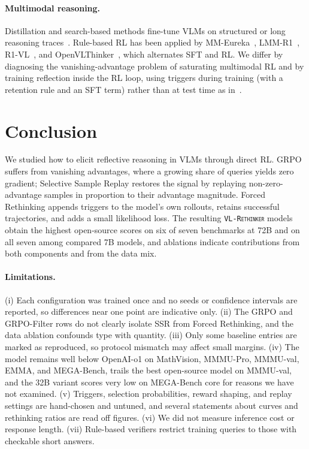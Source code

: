 \documentclass{article}
\newcommand{\model}{\texttt{\textsc{VL-Rethinker}}\xspace}
\begin{document}
\paragraph{Multimodal reasoning.} Distillation and search-based methods fine-tune VLMs on structured or long reasoning traces~\citep{llavacot,Mulberry,llamav_o1,insight_v,R1OneVision,vision-r1,virgo}. Rule-based RL has been applied by MM-Eureka~\citep{mmeureka}, LMM-R1~\citep{lmm-r1}, R1-VL~\citep{r1vl}, and OpenVLThinker~\citep{OpenVLThinker}, which alternates SFT and RL. We differ by diagnosing the vanishing-advantage problem of saturating multimodal RL and by training reflection inside the RL loop, using triggers during training (with a retention rule and an SFT term) rather than at test time as in~\citet{s1}.

\section{Conclusion}
\label{sec:conclusion}

We studied how to elicit reflective reasoning in VLMs through direct RL. GRPO suffers from vanishing advantages, where a growing share of queries yields zero gradient; Selective Sample Replay restores the signal by replaying non-zero-advantage samples in proportion to their advantage magnitude. Forced Rethinking appends triggers to the model's own rollouts, retains successful trajectories, and adds a small likelihood loss. The resulting \model models obtain the highest open-source scores on six of seven benchmarks at 72B and on all seven among compared 7B models, and ablations indicate contributions from both components and from the data mix.

\paragraph{Limitations.} (i) Each configuration was trained once and no seeds or confidence intervals are reported, so differences near one point are indicative only. (ii) The GRPO and GRPO-Filter rows do not clearly isolate SSR from Forced Rethinking, and the data ablation confounds type with quantity. (iii) Only some baseline entries are marked as reproduced, so protocol mismatch may affect small margins. (iv) The model remains well below OpenAI-o1 on MathVision, MMMU-Pro, MMMU-val, EMMA, and MEGA-Bench, trails the best open-source model on MMMU-val, and the 32B variant scores very low on MEGA-Bench core for reasons we have not examined. (v) Triggers, selection probabilities, reward shaping, and replay settings are hand-chosen and untuned, and several statements about curves and rethinking ratios are read off figures. (vi) We did not measure inference cost or response length. (vii) Rule-based verifiers restrict training queries to those with checkable short answers.



{\small\setlength{\bibsep}{1pt}
}
\end{document}
